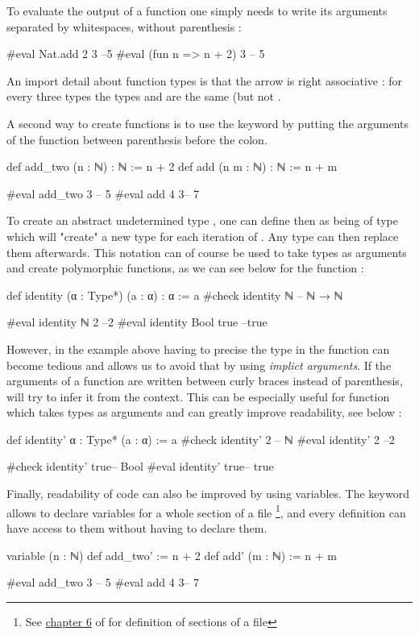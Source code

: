 To evaluate the output of a function one simply needs to write its arguments separated by whitespaces, without parenthesis :
\begin{leancode}
#eval Nat.add 2 3 --5
#eval (fun n => n + 2) 3 -- 5
\end{leancode}

An import detail about function types is that the arrow \lean{\to} is right associative : for every three types  the types  and  are the same (but not .

A second way to create functions is to use the  keyword by putting the arguments of the function between parenthesis before the colon.

\begin{leancode}
def add_two (n : ℕ) : ℕ := n + 2
def add (n m : ℕ) : ℕ := n + m

#eval add_two 3 -- 5
#eval add 4 3-- 7
\end{leancode}

To create an abstract undetermined type , one can define then as being of type  which will "create" a new type for each iteration of . Any type can then replace them afterwards.
This notation can of course be used to take types as arguments and create polymorphic functions, as we can see below for the  function :
\begin{leancode}
def identity (α : Type*) (a : α) : α := a
#check identity ℕ -- ℕ → ℕ

#eval identity ℕ 2 --2
#eval identity Bool true --true 
\end{leancode}

However, in the example above having to precise the type  in the  function can become tedious and \Lean allows us to avoid that by using \emph{implict arguments}. If the arguments of a function are written between curly braces instead of parenthesis, \Lean will try to infer it from the context.
 This can be especially useful for function which takes types as arguments and can greatly improve readability, see below :
\begin{leancode}
def identity' {α : Type*}  (a : α) := a
#check identity' 2 -- ℕ 
#eval identity' 2 --2

#check identity' true-- Bool
#eval identity' true-- true
\end{leancode}

Finally, readability of \Lean code can also be improved by using variables. The  keyword allows to declare variables for a whole section of a file \footnote{See \href{https://leanprover.github.io/theorem_proving_in_lean4/interacting_with_lean.html}{chapter 6} of \cite{noauthor_theorem_nodate} for definition of sections of a \Lean file}, and every definition can have access to them without having to declare them.
\begin{leancode}
variable (n : ℕ)
def add_two' := n + 2
def add' (m : ℕ) := n + m

#eval add_two 3 -- 5
#eval add 4 3-- 7
\end{leancode}

